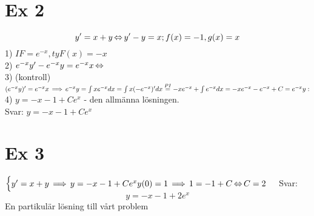 \documentclass{article}
\begin{document}
\section{Ex 2}
$$ y' = x+y \operatorname{\Leftrightarrow} y' - y = x; f(x) = -1, g(x) = x $$
1) $ IF = e^{-x}, ty F(x) = -x$\\
2) $ e^{-x}y' - e^{-x}y = e^{-x}x \operatorname{\Leftrightarrow} $\\
3) (kontroll) $ (e^{-x}y)' = e^{-x}x \operatorname{\implies} e^{-x}y = \int{xe^{-x} dx} = \int{x(-e^{-x})' dx} \overset{PI}{=} -xe^{-x} + \int{e^{-x} dx} = -xe^{-x} - e^{-x} + C = e^{-x}y:$\\
4) $ y=-x-1+Ce^x $ - den allmänna lösningen.\\
Svar: $ y=-x-1 + Ce^x $

\section{Ex 3}
$
\begin{cases}
  y' = x+y \operatorname{\implies} y= -x-1+Ce^x
  y(0) = 1 \operatorname{\implies} 1=-1+C \operatorname{\Leftrightarrow} C=2
\end{cases}
$
Svar: $$ y=-x -1+2e^x $$ En partikulär lösning till vårt problem
\end{document}
